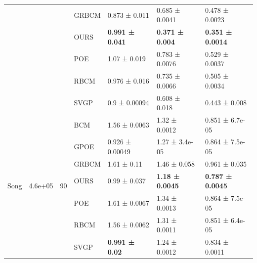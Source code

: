 \begin{table}[ht]
\begin{tabular}{lllllll}
 &  &  & GRBCM & 0.873 ± 0.011 & 0.685 ± 0.0041 & 0.478 ± 0.0023 \\
 &  &  & OURS & \bfseries 0.991 ± 0.041 & \bfseries 0.371 ± 0.004 & \bfseries 0.351 ± 0.0014 \\
 &  &  & POE & 1.07 ± 0.019 & 0.783 ± 0.0076 & 0.529 ± 0.0037 \\
 &  &  & RBCM & 0.976 ± 0.016 & 0.735 ± 0.0066 & 0.505 ± 0.0034 \\
 &  &  & SVGP & 0.9 ± 0.00094 & 0.608 ± 0.018 & 0.443 ± 0.008 \\
\midrule
\multirow[c]{7}{*}{Song} & \multirow[c]{7}{*}{4.6e+05} & \multirow[c]{7}{*}{90} & BCM & 1.56 ± 0.0063 & 1.32 ± 0.0012 & 0.851 ± 6.7e-05 \\
 &  &  & GPOE & 0.926 ± 0.00049 & 1.27 ± 3.4e-05 & 0.864 ± 7.5e-05 \\
 &  &  & GRBCM & 1.61 ± 0.11 & 1.46 ± 0.058 & 0.961 ± 0.035 \\
 &  &  & OURS & 0.99 ± 0.037 & \bfseries 1.18 ± 0.0045 & \bfseries 0.787 ± 0.0045 \\
 &  &  & POE & 1.61 ± 0.0067 & 1.34 ± 0.0013 & 0.864 ± 7.5e-05 \\
 &  &  & RBCM & 1.56 ± 0.0062 & 1.31 ± 0.0011 & 0.851 ± 6.4e-05 \\
 &  &  & SVGP & \bfseries 0.991 ± 0.02 & 1.24 ± 0.0012 & 0.834 ± 0.0011 \\
\bottomrule
\end{tabular}
\end{table}
\pagebreak

